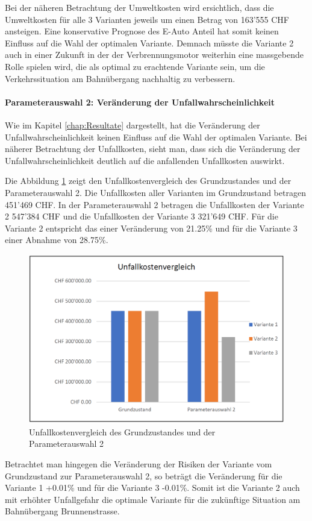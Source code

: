 Bei der näheren Betrachtung der Umweltkosten wird ersichtlich, dass die Umweltkosten für alle 3 Varianten jeweils um einen Betrag von 163'555 CHF ansteigen. Eine konservative Prognose des E-Auto Anteil hat somit keinen Einfluss auf die Wahl der optimalen Variante. Demnach müsste die Variante 2 auch in einer Zukunft in der der Verbrennungsmotor weiterhin eine massgebende Rolle spielen wird, die als optimal zu erachtende Variante sein, um die Verkehrssituation am Bahnübergang nachhaltig zu verbessern.


\paragraph{Parameterauswahl 2: Veränderung der Unfallwahrscheinlichkeit} 

Wie im Kapitel \ref{chap:Resultate} dargestellt, hat die Veränderung der Unfallwahrscheinlichkeit keinen Einfluss auf die Wahl der optimalen Variante. Bei näherer Betrachtung der Unfallkosten, sieht man, dass sich die Veränderung der Unfallwahrscheinlichkeit deutlich auf die anfallenden Unfallkosten auswirkt. 

Die Abbildung \ref{img:UnfallVer.Z0-2} zeigt den Unfallkostenvergleich des Grundzustandes und der Parameterauswahl 2. Die Unfallkosten aller Varianten im Grundzustand betragen 451'469 CHF. In der Parameterauswahl 2 betragen die Unfallkosten der Variante 2 547'384 CHF und die Unfallkosten der Variante 3 321'649 CHF. Für die Variante 2 entspricht das einer Veränderung von 21.25\% und für die Variante 3 einer Abnahme von 28.75\%. 

\begin{figure}[h!]
	\centering
	\includegraphics[width=.5\textwidth]{figures/f-06-03-Unfallkostenvergleich-Z0-Z2}
	\caption[Unfallkostenvergleich: Grundzustand und Parameterauswahl 2]{Unfallkostenvergleich des Grundzustandes und der Parameterauswahl 2}
	\label{img:UnfallVer.Z0-2}
\end{figure}

Betrachtet man hingegen die Veränderung der Risiken der Variante vom Grundzustand zur Parameterauswahl 2, so beträgt die Veränderung für die Variante 1 +0.01\% und für die Variante 3 -0.01\%. 
Somit ist die Variante 2 auch mit erhöhter Unfallgefahr die optimale Variante für die zukünftige Situation am Bahnübergang Brunnenstrasse. 
 

